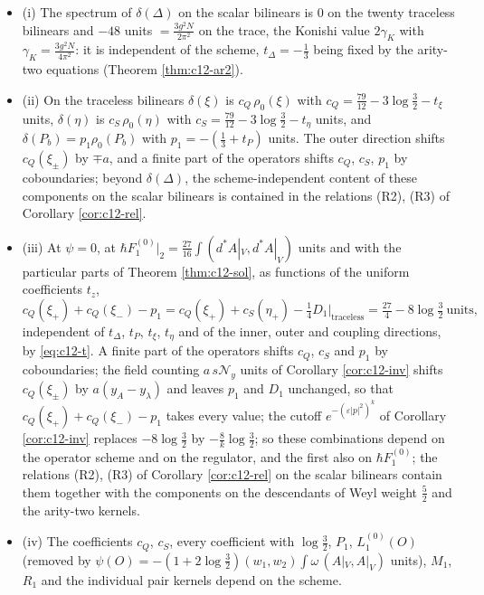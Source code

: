 \begin{corollary}
\label{cor:c12-F0inv}
\begin{itemize}
\item (i) The spectrum of $\delta(\Delta)$ on the scalar bilinears is $0$ on the twenty traceless bilinears and $-48$ units $=\tfrac{3g^2N}{2\pi^2}$ on the trace, the Konishi value $2\gamma_K$ with $\gamma_K=\tfrac{3g^2N}{4\pi^2}$: it is independent of the scheme, $t_\Delta=-\tfrac13$ being fixed by the arity-two equations (Theorem \ref{thm:c12-ar2}).
\item (ii) On the traceless bilinears $\delta(\xi)$ is $c_Q\,\rho_0(\xi)$ with $c_Q=\tfrac{79}{12}-3\log\tfrac32-t_\xi$ units, $\delta(\eta)$ is $c_S\,\rho_0(\eta)$ with $c_S=\tfrac{79}{12}-3\log\tfrac32-t_\eta$ units, and $\delta(P_b)=p_1\rho_0(P_b)$ with $p_1=-(\tfrac13+t_P)$ units. The outer direction shifts $c_Q(\xi_\pm)$ by $\mp a$, and a finite part of the operators shifts $c_Q$, $c_S$, $p_1$ by coboundaries; beyond $\delta(\Delta)$, the scheme-independent content of these components on the scalar bilinears is contained in the relations (R2), (R3) of Corollary \ref{cor:c12-rel}.
\item (iii) At $\psi=0$, at $\hbar F_1^{(0)}|_2=\tfrac{27}{16}\int(d^*A|_V,d^*A|_V)$ units and with the particular parts of Theorem \ref{thm:c12-sol}, as functions of the uniform coefficients $t_z$,
\begin{equation}
c_Q(\xi_+)+c_Q(\xi_-)-p_1=c_Q(\xi_+)+c_S(\eta_+)-\tfrac14D_1\big|_{\text{traceless}}=\tfrac{27}4-8\log\tfrac32\ \text{units},
\label{eq:c12-F0inv}
\end{equation}
independent of $t_\Delta$, $t_P$, $t_\xi$, $t_\eta$ and of the inner, outer and coupling directions, by \eqref{eq:c12-t}. A finite part of the operators shifts $c_Q$, $c_S$ and $p_1$ by coboundaries; the field counting $a\,s\mathcal N_y$ units of Corollary \ref{cor:c12-inv} shifts $c_Q(\xi_\pm)$ by $a(y_A-y_\lambda)$ and leaves $p_1$ and $D_1$ unchanged, so that $c_Q(\xi_+)+c_Q(\xi_-)-p_1$ takes every value; the cutoff $e^{-(\varepsilon|p|^2)^k}$ of Corollary \ref{cor:c12-inv} replaces $-8\log\tfrac32$ by $-\tfrac8k\log\tfrac32$; so these combinations depend on the operator scheme and on the regulator, and the first also on $\hbar F_1^{(0)}$; the relations (R2), (R3) of Corollary \ref{cor:c12-rel} on the scalar bilinears contain them together with the components on the descendants of Weyl weight $\tfrac52$ and the arity-two kernels.
\item (iv) The coefficients $c_Q$, $c_S$, every coefficient with $\log\tfrac32$, $P_1$, $L_1^{(0)}(O)$ (removed by $\psi(O)=-(1+2\log\tfrac32)(w_1,w_2)\int\omega\,(A|_V,A|_V)$ units), $M_1$, $R_1$ and the individual pair kernels depend on the scheme.
\end{itemize}
\end{corollary}

